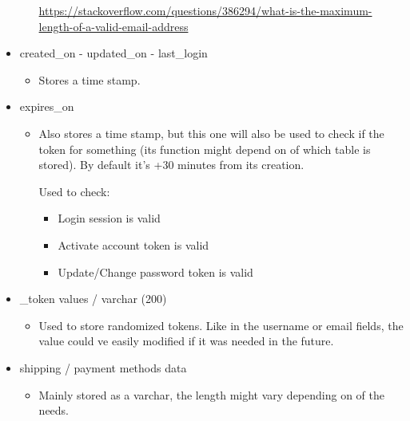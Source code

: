 \begin{flushleft}
\begin{itemize}
\begin{itemize}
\begin{flushleft}
                \url{https://stackoverflow.com/questions/386294/what-is-the-maximum-length-of-a-valid-email-address}
            \end{flushleft}
        \end{itemize}
        \item created\_on - updated\_on - last\_login
        \begin{itemize}
            \item Stores a time stamp.
        \end{itemize}
        \item expires\_on
        \begin{itemize}

            \item Also stores a time stamp, but this one will also be used to check if the token for something (its function
            might depend on of which table is stored).
            By default  it's +30 minutes from its creation.
            \begin{flushleft}
                Used to check:
                \begin{itemize}
                    \item Login session is valid
                    \item Activate account token is valid
                    \item Update/Change password token is valid
                \end{itemize}
            \end{flushleft}
        \end{itemize}
        \item \_token values / varchar (200)
        \begin{itemize}
            \item Used to store randomized tokens.
            Like in the username or email fields, the value could ve easily modified if it was needed in the future.
        \end{itemize}
        \item shipping / payment methods data
        \begin{itemize}
            \item Mainly stored as a varchar, the length might vary depending on of the needs.
        \end{itemize}
    \end{itemize}
\end{flushleft}

\newpage
